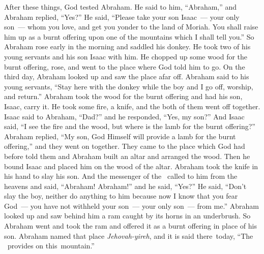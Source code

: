 
\begin{inparaenum}
   After these things, God tested Abraham. He said to him, ``Abraham,'' and Abraham replied, ``Yes?''%
   He said, ``Please take your son Isaac~--- your only son~--- whom you love, and get you yonder to the land of Moriah. You shall raise him up as a burnt offering upon one of the mountains which I shall tell you.''%
   So Abraham rose early in the morning and saddled his donkey. He took two of his young servants and his son Isaac with him. He chopped up some wood for the burnt offering, rose, and went to the place where God told him to go.%
   On the third day, Abraham looked up and saw the place afar off.%
   Abraham said to his young servants, ``Stay here with the donkey while the boy and I go off, worship, and return.''%
   Abraham took the wood for the burnt offering and had his son, Isaac, carry it. He took some fire, a knife, and the both of them went off together.%
   Isaac said to Abraham, ``Dad?'' and he responded, ``Yes, my son?'' And Isaac said, ``I see the fire and the wood, but where is the lamb for the burnt offering?''%
   Abraham replied, ``My son, God Himself will provide a lamb for the burnt offering,'' and they went on together.%
   They came to the place which God had before told them and Abraham built an altar and arranged the wood. Then he bound Isaac and placed him on the wood of the altar.%
   Abraham took the knife in his hand to slay his son.%
   And the messenger of the \lord\ called to him from the heavens and said, ``Abraham! Abraham!'' and he said, ``Yes?''%
   He said, ``Don't slay the boy, neither do anything to him because now I know that you fear God~--- you have not withheld your son~--- your only son~--- from me.''%
   Abraham looked up and saw behind him a ram caught by its horns in an underbrush. So Abraham went and took the ram and offered it as a burnt offering in place of his son.%
   Abraham named that place \textit{Jehovah-yireh}, and it is said there\understood{}\ today, ``The \lord\ provides on this\understood{}\ mountain.''%

\end{inparaenum}
